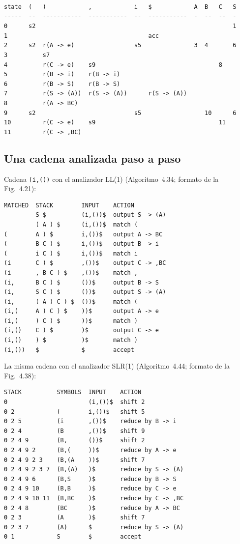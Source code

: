 \documentclass[11pt,a4paper]{article}
\newcommand{\code}[1]{\texttt{#1}}
\begin{document}
\begin{Verbatim}
state  (   )            ,            i   $            A  B   C   S
-----  --  -----------  -----------  --  -----------  -  --  --  -
0      s2                                                        1
1                                        acc
2      s2  r(A -> e)                 s5               3  4       6
3          s7
4          r(C -> e)    s9                                   8
5          r(B -> i)    r(B -> i)
6          r(B -> S)    r(B -> S)
7          r(S -> (A))  r(S -> (A))      r(S -> (A))
8          r(A -> BC)
9      s2                            s5                  10      6
10         r(C -> e)    s9                                   11
11         r(C -> ,BC)
\end{Verbatim}

\subsection{Una cadena analizada paso a paso}
Cadena \code{(i,())} con el analizador LL(1) (Algoritmo~4.34; formato de la Fig.~4.21):
\begin{Verbatim}
MATCHED  STACK        INPUT    ACTION
         S $          (i,())$  output S -> (A)
         ( A ) $      (i,())$  match (
(        A ) $        i,())$   output A -> BC
(        B C ) $      i,())$   output B -> i
(        i C ) $      i,())$   match i
(i       C ) $        ,())$    output C -> ,BC
(i       , B C ) $    ,())$    match ,
(i,      B C ) $      ())$     output B -> S
(i,      S C ) $      ())$     output S -> (A)
(i,      ( A ) C ) $  ())$     match (
(i,(     A ) C ) $    ))$      output A -> e
(i,(     ) C ) $      ))$      match )
(i,()    C ) $        )$       output C -> e
(i,()    ) $          )$       match )
(i,())   $            $        accept
\end{Verbatim}
La misma cadena con el analizador SLR(1) (Algoritmo~4.44; formato de la Fig.~4.38):
\begin{Verbatim}
STACK          SYMBOLS  INPUT    ACTION
0                       (i,())$  shift 2
0 2            (        i,())$   shift 5
0 2 5          (i       ,())$    reduce by B -> i
0 2 4          (B       ,())$    shift 9
0 2 4 9        (B,      ())$     shift 2
0 2 4 9 2      (B,(     ))$      reduce by A -> e
0 2 4 9 2 3    (B,(A    ))$      shift 7
0 2 4 9 2 3 7  (B,(A)   )$       reduce by S -> (A)
0 2 4 9 6      (B,S     )$       reduce by B -> S
0 2 4 9 10     (B,B     )$       reduce by C -> e
0 2 4 9 10 11  (B,BC    )$       reduce by C -> ,BC
0 2 4 8        (BC      )$       reduce by A -> BC
0 2 3          (A       )$       shift 7
0 2 3 7        (A)      $        reduce by S -> (A)
0 1            S        $        accept
\end{Verbatim}
\end{document}
